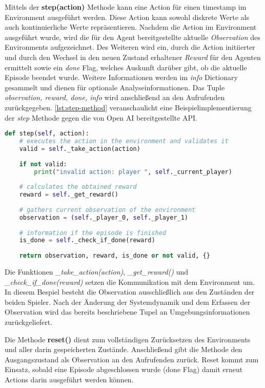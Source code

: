 \documentclass[11pt]{scrartcl}
\begin{document}
Mittels der \textbf{step(action)} Methode kann eine Action für einen timestamp im
Environment ausgeführt werden. Diese Action kann sowohl diskrete Werte als auch 
kontinuierliche Werte repräsentieren. Nachdem die Action im Environment ausgeführt wurde,
wird die für den Agent bereitgestellte aktuelle \textit{Observation} des Environments
aufgezeichnet. Des Weiteren wird ein, durch die Action initiierter und durch den Wechsel
in den neuen Zustand erhaltener \textit{Reward} für den Agenten ermittelt sowie ein 
\textit{done} Flag, welches Auskunft darüber gibt, ob die aktuelle Episode beendet wurde.
Weitere Informationen werden im \textit{info} Dictionary gesammelt und dienen für optionale
Analyseinformationen. Das Tuple \textit{observation, reward, done, info} wird anschließend
an den Aufrufenden zurückgegeben. \autoref{lst:step-method} veranschaulicht eine
Beispielimplementierung der \textit{step} Methode gegen die von Open AI bereitgestellte API.

\begin{lstlisting}[language=Python, caption=step method, label=lst:step-method]
def step(self, action):
	# executes the action in the environment and validates it
	valid = self._take_action(action)
	
	if not valid:
		print("invalid action: player ", self._current_player)
	
	# calculates the obtained reward
	reward = self._get_reward()
	
	# gathers current observation of the environment
	observation = (self._player_0, self._player_1)
	
	# information if the episode is finished
	is_done = self._check_if_done(reward)
    
	return observation, reward, is_done or not valid, {}
\end{lstlisting}

Die Funktionen \textit{\_take\_action(action)}, \textit{\_get\_reward()} und 
\textit{\_check\_if\_done(reward)} setzen die Kommunikation mit dem Environment um. In
diesem Bespiel besteht die Observation ausschließlich aus den Zuständen der beiden Spieler.
Nach der Änderung der Systemdynamik und dem Erfassen der Observation wird das bereits
beschriebene Tupel an Umgebungsinformationen zurückgeliefert.
\newline

\noindent
Die Methode \textbf{reset()} dient zum vollständigen Zurücksetzen des Environments und aller
darin gespeicherten Zustände. Anschließend gibt die Methode den Ausgangszustand als Observation
an den Aufrufenden zurück. Reset kommt zum Einsatz, sobald eine Episode abgeschlossen wurde
(done Flag) damit erneut Actions darin ausgeführt werden können.
\newline
\end{document}
